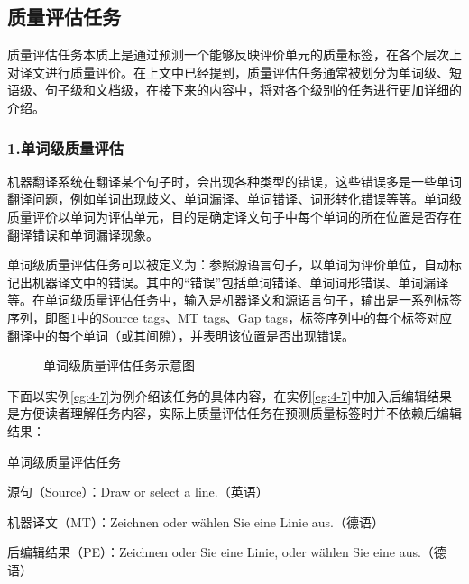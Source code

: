 
\subsection{质量评估任务}

\parinterval 质量评估任务本质上是通过预测一个能够反映评价单元的质量标签，在各个层次上对译文进行质量评价。在上文中已经提到，质量评估任务通常被划分为单词级、短语级、句子级和文档级，在接下来的内容中，将对各个级别的任务进行更加详细的介绍。


\subsubsection{1.单词级质量评估}

\parinterval 机器翻译系统在翻译某个句子时，会出现各种类型的错误，这些错误多是一些单词翻译问题，例如单词出现歧义、单词漏译、单词错译、词形转化错误等等。单词级质量评价以单词为评估单元，目的是确定译文句子中每个单词的所在位置是否存在翻译错误和单词漏译现象。

\parinterval 单词级质量评估任务可以被定义为：参照源语言句子，以单词为评价单位，自动标记出机器译文中的错误。其中的“错误”包括单词错译、单词词形错误、单词漏译等。在单词级质量评估任务中，输入是机器译文和源语言句子，输出是一系列标签序列，即图\ref{fig:4-11}中的Source tags、MT tags、Gap tags，标签序列中的每个标签对应翻译中的每个单词（或其间隙），并表明该位置是否出现错误。

\begin{figure}[htp]
    \centering
	
   \caption{单词级质量评估任务示意图}
   \label{fig:4-11}
\end{figure}

\parinterval 下面以实例\ref{eg:4-7}为例介绍该任务的具体内容，在实例\ref{eg:4-7}中加入后编辑结果是方便读者理解任务内容，实际上质量评估任务在预测质量标签时并不依赖后编辑结果：

\begin{example}
单词级质量评估任务

源句（Source）：Draw or select a line.（英语）

机器译文（MT）：Zeichnen oder wählen Sie eine Linie aus.（德语）

后编辑结果（PE）：Zeichnen oder Sie eine Linie, oder wählen Sie eine aus.（德语）

\label{eg:4-7}
\end{example}

